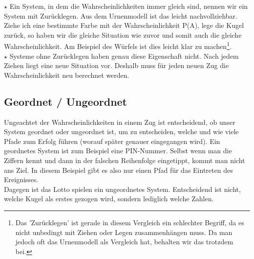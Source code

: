 		\(\star\) Ein System, in dem die Wahrscheinlichkeiten immer gleich sind,
		nennen wir ein System mit Zurücklegen. Aus dem Urnenmodell ist das leicht
		nachvollziehbar. Ziehe ich eine bestimmte Farbe mit der Wahrscheinlichkeit
		P(A), lege die Kugel zurück, so haben wir die gleiche Situation wie zuvor und
		somit auch die gleiche Wahrscheinlichkeit. Am Beispiel des Würfels ist dies
		leicht klar zu machen\footnote{Das 'Zurücklegen' ist gerade in diesem
		Vergleich ein schlechter Begriff, da es nicht unbedingt mit Ziehen oder Legen
		zusammenhängen muss. Da man jedoch oft das Urnenmodell als Vergleich hat,
		behalten wir das trotzdem bei.}.\\
		
		\(\star\) Systeme ohne Zurücklegen haben genau diese Eigenschaft nicht. Nach
		jedem Ziehen liegt eine neue Situation vor. Deshalb muss für jeden neuen Zug
		die Wahrscheinlichkeit neu berechnet werden.

	\subsection{Geordnet / Ungeordnet}
		Ungeachtet der Wahrscheinlichkeiten in einem Zug ist entscheidend, ob unser
		System geordnet oder ungeordnet ist, um zu entscheiden, welche und wie viele
		Pfade zum Erfolg führen (worauf später genauer eingegangen wird). Ein
		geordnetes System ist zum Beispiel eine PIN-Nummer. Selbst wenn man die
		Ziffern kennt und dann in der falschen Reihenfolge eingetippt, kommt man nicht
		ans Ziel. In diesem Beispiel gibt es also nur einen Pfad für das Eintreten des
		Ereignisses.\\
		Dagegen ist das Lotto spielen ein ungeordnetes System. Entscheidend ist nicht,
		welche Kugel als erstes gezogen wird, sondern lediglich welche Zahlen.
